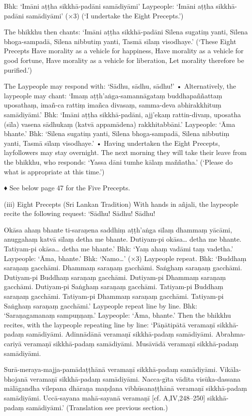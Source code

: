 Bhk: ‘Imāni aṭṭha sikkhā-padāni samādiyāmi’
Laypeople:
‘Imāni aṭṭha sikkhā-padāni samādiyāmi’ (×3)
(‘I undertake the Eight Precepts.’)

The bhikkhu then chants:
‘Imāni aṭṭha sikkhā-padāni
Sīlena sugatiṃ yanti,
Sīlena bhoga-sampadā,
Sīlena nibbutiṃ yanti,
Tasmā sīlaṃ visodhaye.’
(‘These Eight Precepts
Have morality as a vehicle for happiness,
Have morality as a vehicle for good fortune,
Have morality as a vehicle for liberation,
Let morality therefore be purified.’)

The Laypeople may respond with:
‘Sādhu, sādhu, sādhu!’
• Alternatively, the laypeople may chant:
‘Imaṃ aṭṭh’aṅga-samannāgataṃ buddhapaññattaṃ uposathaṃ, imañ-ca rattiṃ imañca divasaṃ, samma-deva abhirakkhituṃ
samādiyāmi.’
Bhk:
‘Imāni aṭṭha sikkhā-padāni,
ajj’ekaṃ rattin-divaṃ,
uposatha (sīla) vasena sādhukaṃ (katvā
appamādena) rakkhitabbāni.’
Laypeople:
‘Āma bhante.’
Bhk:
‘Sīlena sugatiṃ yanti,
Sīlena bhoga-sampadā,
Sīlena nibbutiṃ yanti,
Tasmā sīlaṃ visodhaye.’
• Having undertaken the Eight Precepts, layfollowers may stay overnight. The next morning they will take their leave from the bhikkhu,
who responds:
‘Yassa dāni tumhe kālaṃ maññatha.’
(‘Please do what is appropriate at this time.’)

♦ See below page 47 for the Five Precepts.

(iii) Eight Precepts (Sri Lankan Tradition)
With hands in añjali, the laypeople recite the
following request:
‘Sādhu! Sādhu! Sādhu!

Okāsa ahaṃ bhante ti-saraṇena saddhiṃ
aṭṭh’aṅga sīlaṃ dhammaṃ yācāmi,
anuggahaṃ katvā sīlaṃ detha me bhante.
Dutiyam-pi okāsa… detha me bhante.
Tatiyam-pi okāsa… detha me bhante.’
Bhk:
‘Yaṃ ahaṃ vadāmi taṃ vadetha.’
Laypeople: ‘Āma, bhante.’
Bhk:
‘Namo…’ (×3)
Laypeople repeat.
Bhk: ‘Buddhaṃ saraṇaṃ gacchāmi.
Dhammaṃ saraṇaṃ gacchāmi.
Saṅghaṃ saraṇaṃ gacchāmi.
Dutiyam-pi Buddhaṃ saraṇaṃ gacchāmi.
Dutiyam-pi Dhammaṃ saraṇaṃ gacchāmi.
Dutiyam-pi Saṅghaṃ saraṇaṃ gacchāmi.
Tatiyam-pi Buddhaṃ saraṇaṃ gacchāmi.
Tatiyam-pi Dhammaṃ saraṇaṃ gacchāmi.
Tatiyam-pi Saṅghaṃ saraṇaṃ gacchāmi.’
Laypeople repeat line by line.
Bhk:
‘Saraṇagamanaṃ sampuṇṇaṃ.’
Laypeople: ‘Āma, bhante.’
Then the bhikkhu recites, with the laypeople
repeating line by line:
‘Pāṇātipātā veramaṇī sikkhā-padaṃ samādiyāmi.
Adinnādānā veramaṇī sikkhā-padaṃ samādiyāmi.
Abrahma-cariyā veramaṇī sikkhā-padaṃ
samādiyāmi.
Musāvādā veramaṇī sikkhā-padaṃ samādiyāmi.

Surā-meraya-majja-pamādaṭṭhānā veramaṇī
sikkhā-padaṃ samādiyāmi.
Vikāla-bhojanā veramaṇī sikkhā-padaṃ
samādiyāmi.
Nacca-gīta vādita visūka-dassana mālāgandha vilepana dhāraṇa maṇḍana
vibhūsanaṭṭhānā veramaṇī sikkhā-padaṃ
samādiyāmi.
Uccā-sayana mahā-sayanā veramaṇī
[cf. A,IV,248–250]
sikkhā-padaṃ samādiyāmi.’
(Translation see previous section.)

